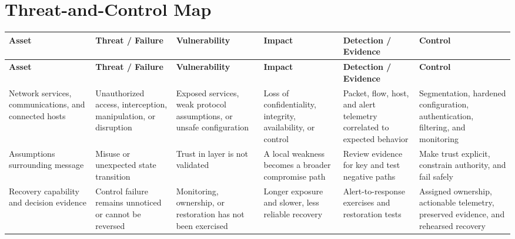 \documentclass[11pt,letterpaper]{article}
\begin{document}
\section*{Threat-and-Control Map}
\begingroup\scriptsize\setlength{\tabcolsep}{2pt}
\begin{longtable}{>{\raggedright\arraybackslash}p{}>{\raggedright\arraybackslash}p{}>{\raggedright\arraybackslash}p{}>{\raggedright\arraybackslash}p{}>{\raggedright\arraybackslash}p{}>{\raggedright\arraybackslash}p{}}
\toprule\rowcolor{Navy}\color{white}\textbf{Asset} & \color{white}\textbf{Threat / Failure} & \color{white}\textbf{Vulnerability} & \color{white}\textbf{Impact} & \color{white}\textbf{Detection / Evidence} & \color{white}\textbf{Control}\\\midrule
\endfirsthead
\toprule\rowcolor{Navy}\color{white}\textbf{Asset} & \color{white}\textbf{Threat / Failure} & \color{white}\textbf{Vulnerability} & \color{white}\textbf{Impact} & \color{white}\textbf{Detection / Evidence} & \color{white}\textbf{Control}\\\midrule
\endhead
Network services, communications, and connected hosts & Unauthorized access, interception, manipulation, or disruption & Exposed services, weak protocol assumptions, or unsafe configuration & Loss of confidentiality, integrity, availability, or control & Packet, flow, host, and alert telemetry correlated to expected behavior & Segmentation, hardened configuration, authentication, filtering, and monitoring\\\midrule
Assumptions surrounding message & Misuse or unexpected state transition & Trust in layer is not validated & A local weakness becomes a broader compromise path & Review evidence for key and test negative paths & Make trust explicit, constrain authority, and fail safely\\\midrule
Recovery capability and decision evidence & Control failure remains unnoticed or cannot be reversed & Monitoring, ownership, or restoration has not been exercised & Longer exposure and slower, less reliable recovery & Alert-to-response exercises and restoration tests & Assigned ownership, actionable telemetry, preserved evidence, and rehearsed recovery\\\midrule
\bottomrule
\end{longtable}
\endgroup
\end{document}
